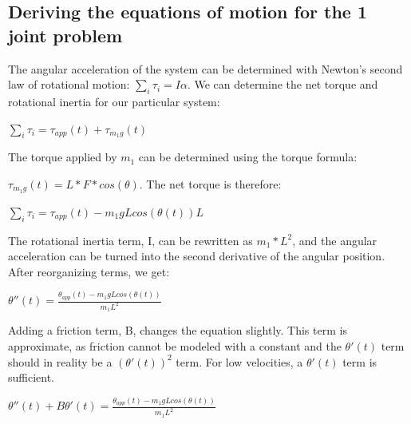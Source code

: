 \documentclass{article}
\begin{document}
\vspace{24pt}


\subsection{Deriving the equations of motion for the 1 joint problem}

\vspace{24pt}

\noindent \justifying The angular acceleration of the system can be determined with Newton's second law of rotational motion: $\sum_i \tau_i = I \alpha$. We can determine the net torque and rotational inertia for our particular system:

\vspace{24pt}

\centering $\sum_i \tau_i = \tau_{app}(t) + \tau_{m_1g}(t)$

\vspace{24pt}

\noindent \justifying The torque applied by $m_1$ can be determined using the torque formula: 

\centering $\tau_{m_1g}(t) = L*F*cos(\theta)$. The net torque is therefore:

\vspace{24pt}

\centering $\sum_i \tau_i = \tau_{app}(t) - m_1gLcos(\theta(t))L$

\vspace{24pt}

\newpage

\noindent \justifying The rotational inertia term, I, can be rewritten as $m_1*L^2$, and the angular acceleration can be turned into the second derivative of the angular position. After reorganizing terms, we get:
\vspace{24pt}

\centering $\theta''(t) = \frac{\theta_{app}(t) - m_1gLcos(\theta(t))}{m_1L^2}$

\vspace{24pt}

\noindent \justifying Adding a friction term, B, changes the equation slightly. This term is approximate, as friction cannot be modeled with a constant and the $\theta'(t)$ term should in reality be a $(\theta'(t))^2$ term. For low velocities, a $\theta'(t)$ term is sufficient.

\vspace{24pt}

\centering $\theta''(t) + B\theta'(t) = \frac{\theta_{app}(t) - m_1gLcos(\theta(t))}{m_1L^2}$
\end{document}

